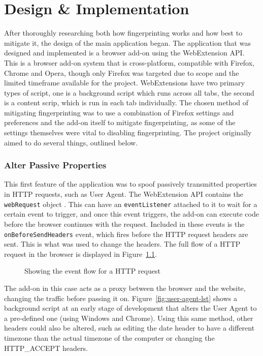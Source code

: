 \chapter{Design \& Implementation}

After thoroughly researching both how fingerprinting works and how best to mitigate it, the design of the main application began.
The application that was designed and implemented is a browser add-on using the WebExtension API\@.
This is a browser add-on system that is cross-platform, compatible with Firefox, Chrome and Opera, though only Firefox was targeted due to scope and the limited timeframe available for the project.
WebExtensions have two primary types of script, one is a background script which runs across all tabs, the second is a content scrip, which is run in each tab individually.
The chosen method of mitigating fingerprinting was to use a combination of Firefox settings and preferences and the add-on itself to mitigate fingerprinting, as some of the settings themselves were vital to disabling fingerprinting.
The project originally aimed to do several things, outlined below.

\subsection{Alter Passive Properties}

This first feature of the application was to spoof passively transmitted properties in HTTP requests, such as User Agent.
The WebExtension API contains the \texttt{webRequest} object \citep{webRequest}.
This can have an \texttt{eventListener} attached to it to wait for a certain event to trigger, and once this event triggers, the add-on can execute code before the browser continues with the request.
Included in these events is the \texttt{onBeforeSendHeaders} event, which fires before the HTTP request headers are sent.
This is what was used to change the headers.
The full flow of a HTTP request in the browser is displayed in Figure~\ref{fig:webRequest-flow}.

\begin{figure}[h]
\centering
\caption{Showing the event flow for a HTTP request}
\label{fig:webRequest-flow}
\end{figure}

The add-on in this case acts as a proxy between the browser and the website, changing the traffic before passing it on.
Figure~\ref{fig:user-agent-lst} shows a background script at an early stage of development that alters the User Agent to a pre-defined one (using Windows and Chrome).
Using this same method, other headers could also be altered, such as editing the date header to have a different timezone than the actual timezone of the computer or changing the HTTP\_ACCEPT headers.

